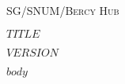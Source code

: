 \documentclass[a5paper]{report}
\begin{document}
  \begin{titlepage}
    \begin{center}
      \scshape{SG/SNUM/Bercy Hub}
    \end{center}

    \vspace*{\fill}
    \begin{center}
    {\huge\scshape $TITLE$}\label{sec:$title$}

    \vspace{1cm}

    {\large\bfseries $VERSION$}\label{subsec:$version$}
    \end{center}
    \vspace*{\fill}
  \end{titlepage}

  \newpage
  \newpage

  \begingroup
    \hypersetup{hidelinks}
    \tableofcontents
  \endgroup

  \newpage

  $body$
\end{document}
